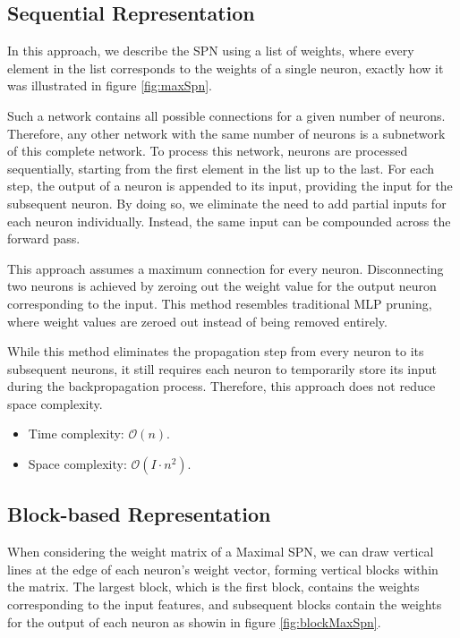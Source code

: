 \subsection{Sequential Representation}

In this approach, we describe the SPN using a list of weights, where every element in the list corresponds to the weights of a single neuron, exactly how it was illustrated in figure \ref{fig:maxSpn}.
 
Such a network contains all possible connections for a given number of neurons. Therefore, any other network with the same number of neurons is a subnetwork of this complete network. To process this network, neurons are processed sequentially, starting from the first element in the list up to the last. For each step, the output of a neuron is appended to its input, providing the input for the subsequent neuron. By doing so, we eliminate the need to add partial inputs for each neuron individually. Instead, the same input can be compounded across the forward pass.

This approach assumes a maximum connection for every neuron. Disconnecting two neurons is achieved by zeroing out the weight value for the output neuron corresponding to the input. This method resembles traditional MLP pruning, where weight values are zeroed out instead of being removed entirely.

While this method eliminates the propagation step from every neuron to its subsequent neurons, it still requires each neuron to temporarily store its input during the backpropagation process. Therefore, this approach does not reduce space complexity.

\begin{itemize}
    \item Time complexity: $\mathcal{O}(n)$.
    \item Space complexity: $\mathcal{O}(I \cdot n^2)$.
\end{itemize}

\subsection{Block-based Representation}

When considering the weight matrix of a Maximal SPN, we can draw vertical lines at the edge of each neuron’s weight vector, forming vertical blocks within the matrix. The largest block, which is the first block, contains the weights corresponding to the input features, and subsequent blocks contain the weights for the output of each neuron as showin in figure \ref{fig:blockMaxSpn}.
 
